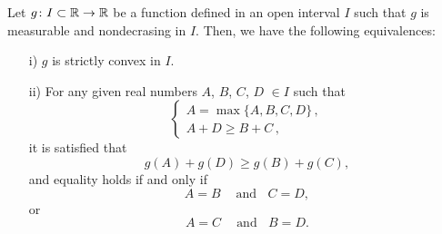 \begin{lemma}
\label{Lemma:InequalitConvexFunctions} Let $g \colon I\subset \mathbb{R} \to \mathbb{R}$ be a function defined in
an open interval $I$ such that $g$ is measurable and nondecrasing in $I$. Then, we have the
following equivalences:
\begin{enumerate}
\item[i)] $g$ is strictly convex in $I$.
\item[ii)] For any given real numbers $A$, $B$, $C$, $D$ $\in I$ such that
\begin{equation}
\label{Eq:AssumptionsInequalitiesABCD}
\begin{cases}
A = \max\{A,B,C,D\}\,, \\
A + D \geq B + C\,,
\end{cases}
\end{equation}
it is satisfied that
$$
g(A) + g(D) \geq g(B) + g(C),
$$
and equality holds if and only if
$$ A = B \ \ \ \ \textrm{ and} \ \ \ \ C=D, $$
or
$$ A = C \ \ \ \ \textrm{ and} \ \ \ \ B=D. $$
\end{enumerate}

\end{lemma}
